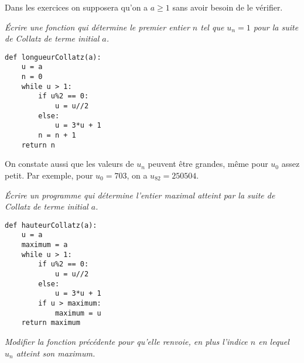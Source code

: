 Dans les exercices on supposera qu'on a $a\ge 1$ sans avoir besoin de le vérifier.
\begin{Exercise}[title= Longueur de vol]\it 
Écrire une fonction  qui détermine le premier entier $n$ tel que $u_n=1$ pour la suite de Collatz de terme initial $a$.
\end{Exercise}
\begin{Answer} 
\begin{lstlisting}
def longueurCollatz(a):
    u = a
    n = 0
    while u > 1:
        if u%2 == 0:
            u = u//2
        else:
            u = 3*u + 1
        n = n + 1
    return n
\end{lstlisting}
\end{Answer}
On constate aussi que les valeurs de $u_n$ peuvent être grandes, même pour $u_0$ assez petit. Par exemple, pour $u_0 = 703$, on a $u_{82}= 250504$.
\begin{Exercise}[title= Hauteur de vol]\it
Écrire un programme  qui détermine l'entier maximal atteint par la suite de Collatz de terme initial $a$.
\end{Exercise}
\begin{Answer} 
\begin{lstlisting}
def hauteurCollatz(a):
    u = a
    maximum = a
    while u > 1:
        if u%2 == 0:
            u = u//2
        else:
            u = 3*u + 1
        if u > maximum:
            maximum = u
    return maximum
\end{lstlisting}
\end{Answer}
\begin{Exercise}[title= {Hauteur de vol, bis}]\it
Modifier la fonction précédente pour qu'elle renvoie, en plus l'indice $n$ en lequel $u_n$ atteint son maximum.
\end{Exercise}
